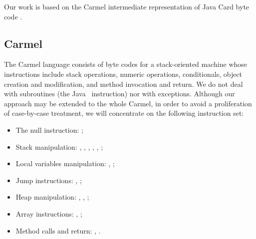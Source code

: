Our work is based on the Carmel intermediate representation of Java Card
byte code \cite{marlet01sjc}. 

\subsection{Carmel}
The Carmel language consists of byte codes for a
stack-oriented machine whose 
instructions include stack operations, numeric operations,
conditionals, object creation and modification, and method invocation
and return. We do not deal with subroutines (the Java \jsr\ instruction) nor with exceptions. Although our approach may be extended to the whole Carmel, in order to avoid a proliferation of case-by-case treatment, we will concentrate on the following instruction set:

\begin{itemize}
\item The null instruction: \nop;
\item Stack manipulation: \push, \pop, \dup, , \swap, \numop;
\item Local variables manipulation: \load, \store;
\item Jump instructions: \If, \goto;
\item Heap manipulation: \new, \putfd, \getfd;
\item Array instructions: \arrst, \arrld;
\item Method calls and return: \invvir, \return.
\end{itemize}




\newcommand{\spp}{\hspace{1.5cm}}

